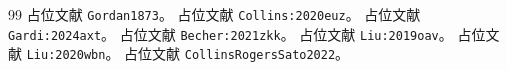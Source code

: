 \begin{thebibliography}{99}
 占位文献 \texttt{Gordan1873}。
 占位文献 \texttt{Collins:2020euz}。
 占位文献 \texttt{Gardi:2024axt}。
 占位文献 \texttt{Becher:2021zkk}。
 占位文献 \texttt{Liu:2019oav}。
 占位文献 \texttt{Liu:2020wbn}。
 占位文献 \texttt{CollinsRogersSato2022}。
\end{thebibliography}
